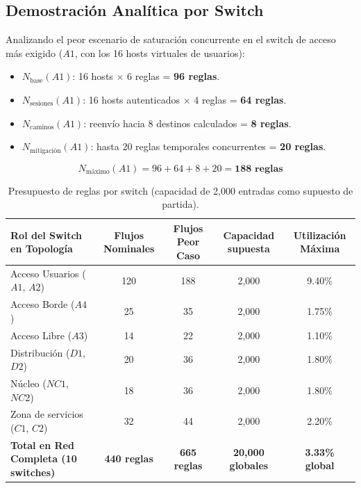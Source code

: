 \documentclass[11pt,a4paper]{report}
\begin{document}
\subsection{Demostración Analítica por Switch}
Analizando el peor escenario de saturación concurrente en el switch de acceso más exigido ($A1$, con los 16 hosts virtuales de usuarios):
\begin{itemize}[leftmargin=*]
    \item $N_{\text{base}}(A1)$: 16 hosts $\times$ 6 reglas = \textbf{96 reglas}.
    \item $N_{\text{sesiones}}(A1)$: 16 hosts autenticados $\times$ 4 reglas = \textbf{64 reglas}.
    \item $N_{\text{caminos}}(A1)$: reenvío hacia 8 destinos calculados = \textbf{8 reglas}.
    \item $N_{\text{mitigación}}(A1)$: hasta 20 reglas temporales concurrentes = \textbf{20 reglas}.
\end{itemize}
\begin{equation}
N_{\text{máximo}}(A1) = 96 + 64 + 8 + 20 = \mathbf{188\text{ reglas}}
\end{equation}

\begin{table}[h!]
\centering
\small
\begin{tabularx}{\linewidth}{Xcccc}
\toprule
\textbf{Rol del Switch en Topología} & \textbf{Flujos Nominales} & \textbf{Flujos Peor Caso} & \textbf{Capacidad supuesta} & \textbf{Utilización Máxima} \\
\midrule
Acceso Usuarios ($A1$, $A2$) & 120 & 188 & 2,000 & 9.40\% \\
Acceso Borde ($A4$) & 25 & 35 & 2,000 & 1.75\% \\
Acceso Libre ($A3$) & 14 & 22 & 2,000 & 1.10\% \\
Distribución ($D1$, $D2$) & 20 & 36 & 2,000 & 1.80\% \\
Núcleo ($NC1$, $NC2$) & 18 & 36 & 2,000 & 1.80\% \\
Zona de servicios ($C1$, $C2$) & 32 & 44 & 2,000 & 2.20\% \\
\midrule
\textbf{Total en Red Completa (10 switches)} & \textbf{440 reglas} & \textbf{665 reglas} & \textbf{20,000 globales} & \textbf{3.33\% global} \\
\bottomrule
\end{tabularx}
\caption{Presupuesto de reglas por switch (capacidad de 2,000 entradas como supuesto de partida).}
\label{tab:tcam}
\end{table}
\end{document}

